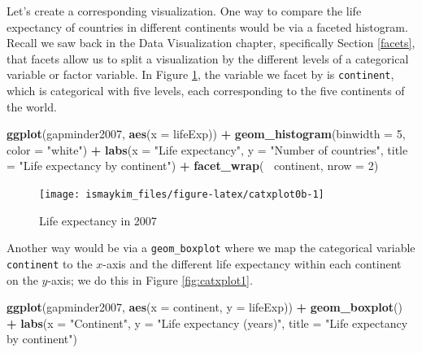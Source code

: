 \documentclass[12pt, krantz2,]{krantz}
\makeatletter
\newenvironment{Shaded}{\begin{snugshade}}{\end{snugshade}}
\newcommand{\DataTypeTok}[1]{\textcolor[rgb]{0.27,0.27,0.27}{#1}}
\newcommand{\DecValTok}[1]{\textcolor[rgb]{0.06,0.06,0.06}{#1}}
\newcommand{\KeywordTok}[1]{\textcolor[rgb]{0.27,0.27,0.27}{\textbf{#1}}}
\newcommand{\NormalTok}[1]{#1}
\newcommand{\OperatorTok}[1]{\textcolor[rgb]{0.43,0.43,0.43}{\textbf{#1}}}
\newcommand{\StringTok}[1]{\textcolor[rgb]{0.5,0.5,0.5}{#1}}
\newenvironment{kframe}{%
\medskip{}
\setlength{\fboxsep}{.8em}
 \def\at@end@of@kframe{}%
 \ifinner\ifhmode%
  \def\at@end@of@kframe{\end{minipage}}%
  \begin{minipage}{\columnwidth}%
 \fi\fi%
 \def\FrameCommand##1{\hskip\@totalleftmargin \hskip-\fboxsep
 \colorbox{shadecolor}{##1}\hskip-\fboxsep
     \hskip-\linewidth \hskip-\@totalleftmargin \hskip\columnwidth}%
 \MakeFramed {\advance\hsize-\width
   \@totalleftmargin\z@ \linewidth\hsize
   \@setminipage}}%
 {\par\unskip\endMakeFramed%
 \at@end@of@kframe}
\renewenvironment{Shaded}{\begin{kframe}}{\end{kframe}}
\makeatother
\begin{document}
Let's create a corresponding visualization. One way to compare the life expectancy of countries in different continents would be via a faceted histogram. Recall we saw back in the Data Visualization chapter, specifically Section \ref{facets}, that facets allow us to split a visualization by the different levels of a categorical variable or factor variable. In Figure \ref{fig:catxplot0b}, the variable we facet by is \texttt{continent}, which is categorical with five levels, each corresponding to the five continents of the world.

\begin{Shaded}
\begin{Highlighting}[]
\KeywordTok{ggplot}\NormalTok{(gapminder2007, }\KeywordTok{aes}\NormalTok{(}\DataTypeTok{x =}\NormalTok{ lifeExp)) }\OperatorTok{+}
\StringTok{  }\KeywordTok{geom_histogram}\NormalTok{(}\DataTypeTok{binwidth =} \DecValTok{5}\NormalTok{, }\DataTypeTok{color =} \StringTok{"white"}\NormalTok{) }\OperatorTok{+}
\StringTok{  }\KeywordTok{labs}\NormalTok{(}\DataTypeTok{x =} \StringTok{"Life expectancy"}\NormalTok{, }\DataTypeTok{y =} \StringTok{"Number of countries"}\NormalTok{, }
       \DataTypeTok{title =} \StringTok{"Life expectancy by continent"}\NormalTok{) }\OperatorTok{+}
\StringTok{  }\KeywordTok{facet_wrap}\NormalTok{(}\OperatorTok{~}\StringTok{ }\NormalTok{continent, }\DataTypeTok{nrow =} \DecValTok{2}\NormalTok{)}
\end{Highlighting}
\end{Shaded}

\begin{figure}

{\centering \texttt{[image: ismaykim\_files/figure-latex/catxplot0b-1]} 

}

\caption{Life expectancy in 2007}\label{fig:catxplot0b}
\end{figure}

Another way would be via a \texttt{geom\_boxplot} where we map the categorical variable \texttt{continent} to the \(x\)-axis and the different life expectancy within each continent on the \(y\)-axis; we do this in Figure \ref{fig:catxplot1}.

\begin{Shaded}
\begin{Highlighting}[]
\KeywordTok{ggplot}\NormalTok{(gapminder2007, }\KeywordTok{aes}\NormalTok{(}\DataTypeTok{x =}\NormalTok{ continent, }\DataTypeTok{y =}\NormalTok{ lifeExp)) }\OperatorTok{+}
\StringTok{  }\KeywordTok{geom_boxplot}\NormalTok{() }\OperatorTok{+}
\StringTok{  }\KeywordTok{labs}\NormalTok{(}\DataTypeTok{x =} \StringTok{"Continent"}\NormalTok{, }\DataTypeTok{y =} \StringTok{"Life expectancy (years)"}\NormalTok{, }
       \DataTypeTok{title =} \StringTok{"Life expectancy by continent"}\NormalTok{) }
\end{Highlighting}
\end{Shaded}
\end{document}
